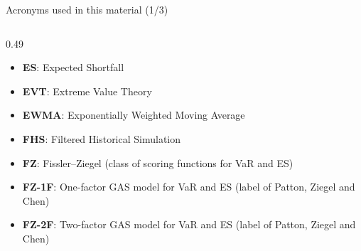 \begin{frame}{Acronyms used in this material (1/3)}
\begin{columns}[T]
\begin{column}{0.49\textwidth}
\begin{itemize}
    \item \textbf{ES}: Expected Shortfall
    \item \textbf{EVT}: Extreme Value Theory
    \item \textbf{EWMA}: Exponentially Weighted Moving Average
    \item \textbf{FHS}: Filtered Historical Simulation
    \item \textbf{FZ}: Fissler–Ziegel (class of scoring functions for VaR and ES)
    \item \textbf{FZ-1F}: One-factor GAS model for VaR and ES (label of Patton, Ziegel and Chen)
    \item \textbf{FZ-2F}: Two-factor GAS model for VaR and ES (label of Patton, Ziegel and Chen)
\end{itemize}
\end{column}
\end{columns}
\end{frame}

